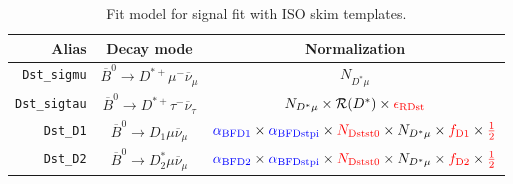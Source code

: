 \begin{landscape}
\begin{table}
\centering
\caption{
    Fit model for \Dstar signal fit with ISO skim templates.
}
\scriptsize

\begin{tabular}{r|c|c}
\toprule
        \textbf{Alias} &                                \textbf{Decay mode}                                &                                                                                                                                                                                   \textbf{Normalization}                                                                                                                                                                                   \\
\midrule
   \texttt{Dst\_sigmu} &           $\overline{B}^0 \rightarrow D^{*+} \mu^- \overline{\nu}_\mu$            &                                                                                                                                                                                       $N_{D^* \mu}$                                                                                                                                                                                        \\
  \texttt{Dst\_sigtau} &          $\overline{B}^0 \rightarrow D^{*+} \tau^- \overline{\nu}_\tau$           &                                                                                                                                                     $N_{D^* \mu} \times \mathcal{R}(D^*) \times \textcolor{red}{\epsilon_\text{RDst}}$                                                                                                                                                     \\
      \texttt{Dst\_D1} &              $\overline{B}^0 \rightarrow D_1 \mu \overline{\nu}_\mu$              &                                                                                  $\textcolor{blue}{\alpha_\text{BFD1}} \times \textcolor{blue}{\alpha_\text{BFDstpi}} \times \textcolor{red}{N_\text{Dstst0}} \times N_{D^* \mu} \times \textcolor{red}{f_\text{D1}} \times \textcolor{red}{\frac{1}{2}}$                                                                                  \\
      \texttt{Dst\_D2} &             $\overline{B}^0 \rightarrow D^*_2 \mu \overline{\nu}_\mu$             &                                                                                  $\textcolor{blue}{\alpha_\text{BFD2}} \times \textcolor{blue}{\alpha_\text{BFDstpi}} \times \textcolor{red}{N_\text{Dstst0}} \times N_{D^* \mu} \times \textcolor{red}{f_\text{D2}} \times \textcolor{red}{\frac{1}{2}}$                                                                                  \\

\end{tabular}
\end{table}
\end{landscape}
